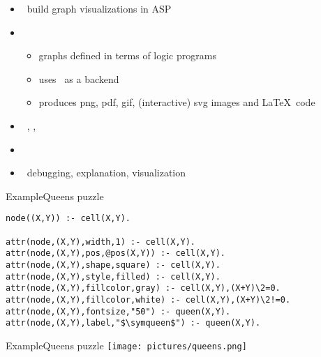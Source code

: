 \begin{frame}{\clingraph}
  \begin{itemize}
    \item {} \ build graph visualizations in ASP
    \item {}
      \begin{itemize}
      \item graphs defined in terms of logic programs %
      \item uses \graphviz\ as a backend
      \item produces png, pdf, gif, (interactive) svg images and \LaTeX\ code
      \end{itemize}
    \item {}   \ \clingo, \clorm, \graphviz
    \item {}   \ \cite{hasascst22a}
    \item {} \ debugging, explanation, visualization %
  \end{itemize}
\end{frame}
\begin{frame}[fragile]{Example}{Queens puzzle}
  \begin{adjustbox}{max totalsize={\textwidth}{.7\textheight},keepaspectratio}
    \begin{lstlisting}[mathescape]
node((X,Y)) :- cell(X,Y).

attr(node,(X,Y),width,1) :- cell(X,Y).
attr(node,(X,Y),pos,@pos(X,Y)) :- cell(X,Y).
attr(node,(X,Y),shape,square) :- cell(X,Y).
attr(node,(X,Y),style,filled) :- cell(X,Y).
attr(node,(X,Y),fillcolor,gray) :- cell(X,Y),(X+Y)\2=0.
attr(node,(X,Y),fillcolor,white) :- cell(X,Y),(X+Y)\2!=0.
attr(node,(X,Y),fontsize,"50") :- queen(X,Y).
attr(node,(X,Y),label,"$\symqueen$") :- queen(X,Y).
    \end{lstlisting}
  \end{adjustbox}
\end{frame}
\begin{frame}[fragile]{Example}{Queens puzzle}
  \texttt{[image: pictures/queens.png]}
\end{frame}
%
